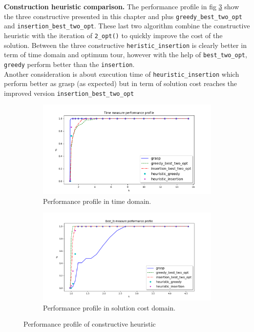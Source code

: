\textbf{Construction heuristic comparison.} The performance profile in fig \ref{fig:pp_Lconstructives} show the three constructive presented in this chapter and plus \texttt{greedy\_best\_two\_opt} and \texttt{insertion\_best\_two\_opt}. These last two algorithm combine the constructive heuristic with the iteration of \texttt{2\_opt()} to quickly improve the cost of the solution. Between the three constructive \texttt{heristic\_insertion} is clearly better in term of time domain and optimum tour, however with the help of 
\texttt{best\_two\_opt}, \texttt{greedy} perform better than the \texttt{insertion}.\\
Another consideration is about execution time of \texttt{heuristic\_insertion} which perform better as grasp (as expected) but in term of solution cost reaches the improved version \texttt{insertion\_best\_two\_opt}

\begin{figure}[!h]
	\centering
	\begin{subfigure}{.9\textwidth}
		\centering
		\includegraphics[width=\columnwidth]{../res/Lconstructives_time.png}
		\caption{Performance profile in time domain.}
		\label{fig:Lconstructives_time}
	\end{subfigure}
	\begin{subfigure}{.9\textwidth}
	\centering
	\includegraphics[width=\columnwidth]{../res/Lconstructives_lb.png}
	\caption{Performance profile in solution cost domain.}
	\label{fig:Lconstructives_lb}
	\end{subfigure}
	\caption{Performance profile of constructive heuristic}
	\label{fig:pp_Lconstructives}
\end{figure}
